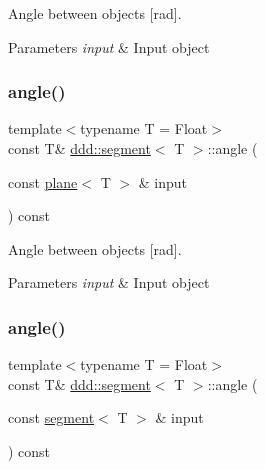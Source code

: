 Angle between objects \mbox{[}rad\mbox{]}. 


\begin{DoxyParams}{Parameters}
{\em input} & Input object \\
\hline
\end{DoxyParams}
\mbox{\label{classddd_1_1segment_ab82b51c357f533765e5141cbeeac2800}} 
\subsubsection{\texorpdfstring{angle()}{angle()}\hspace{0.1cm}{\footnotesize\ttfamily [4/5]}}
{\footnotesize\ttfamily template$<$typename T = Float$>$ \\
const T\& \hyperlink{classddd_1_1segment}{ddd\+::segment}$<$ T $>$\+::angle (\begin{DoxyParamCaption}\item[{const \hyperlink{classddd_1_1plane}{plane}$<$ T $>$ \&}]{input }\end{DoxyParamCaption}) const\hspace{0.3cm}{\ttfamily [inline]}}



Angle between objects \mbox{[}rad\mbox{]}. 


\begin{DoxyParams}{Parameters}
{\em input} & Input object \\
\hline
\end{DoxyParams}
\mbox{\label{classddd_1_1segment_a0b19e53d6aab0dc65290874e05fbb042}} 
\subsubsection{\texorpdfstring{angle()}{angle()}\hspace{0.1cm}{\footnotesize\ttfamily [5/5]}}
{\footnotesize\ttfamily template$<$typename T = Float$>$ \\
const T\& \hyperlink{classddd_1_1segment}{ddd\+::segment}$<$ T $>$\+::angle (\begin{DoxyParamCaption}\item[{const \hyperlink{classddd_1_1segment}{segment}$<$ T $>$ \&}]{input }\end{DoxyParamCaption}) const\hspace{0.3cm}{\ttfamily [inline]}}



